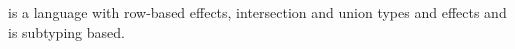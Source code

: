 \core is a language with row-based effects, intersection and union types and effects and is subtyping based. 
